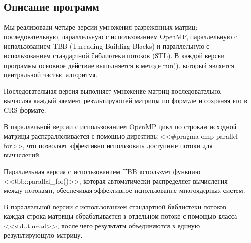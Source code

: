 \documentclass[a4paper, 14pt]{article}
\theoremstyle{plain}
\begin{document}
\newpage
\subsection*{\centering Описание программ}
Мы реализовали четыре версии умножения разреженных матриц: последовательную, параллельную с использованием OpenMP, параллельную с использованием TBB (Threading Building Blocks) и параллельную с использованием стандартной библиотеки потоков (STL). В каждой версии программы основное действие выполняется в методе run(), который является центральной частью алгоритма.

Последовательная версия выполняет умножение матриц последовательно, вычисляя каждый элемент результирующей матрицы по формуле и сохраняя его в CRS формате.

В параллельной версии с использованием OpenMP цикл по строкам исходной матрицы распараллеливается с помощью директивы <<\#pragma omp parallel for>>, что позволяет эффективно использовать доступные потоки для вычислений.

Параллельная версия с использованием TBB использует функцию <<tbb::parallel\_for()>>, которая автоматически распределяет вычисления между потоками, обеспечивая эффективное использование многоядерных систем.

В параллельной версии с использованием стандартной библиотеки потоков каждая строка матрицы обрабатывается в отдельном потоке с помощью класса <<std::thread>>, после чего результаты объединяются в единую результирующую матрицу.
\end{document}
